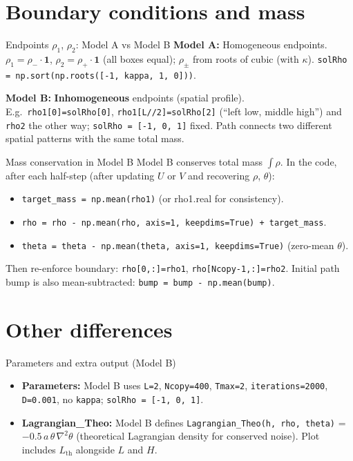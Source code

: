 \documentclass{beamer}
\begin{document}
\section{Boundary conditions and mass}
\begin{frame}{Endpoints $\rho_1$, $\rho_2$: Model A vs Model B}
    \textbf{Model A:} Homogeneous endpoints. $\rho_1 = \rho_- \cdot \mathbf{1}$, $\rho_2 = \rho_+ \cdot \mathbf{1}$ (all boxes equal); $\rho_\pm$ from roots of cubic (with $\kappa$). \texttt{solRho = np.sort(np.roots([-1, kappa, 1, 0]))}.
    \vspace{0.5em}
    
    \textbf{Model B:} \textbf{Inhomogeneous} endpoints (spatial profile). E.g.\ \texttt{rho1[0]=solRho[0]}, \texttt{rho1[L//2]=solRho[2]} (``left low, middle high'') and \texttt{rho2} the other way; \texttt{solRho = [-1, 0, 1]} fixed. Path connects two different spatial patterns with the same total mass.
\end{frame}

\begin{frame}{Mass conservation in Model B}
    Model B conserves total mass $\int \rho$. In the code, after each half-step (after updating $U$ or $V$ and recovering $\rho$, $\theta$):
    \begin{itemize}
        \item \texttt{target\_mass = np.mean(rho1)} (or rho1.real for consistency).
        \item \texttt{rho = rho - np.mean(rho, axis=1, keepdims=True) + target\_mass}.
        \item \texttt{theta = theta - np.mean(theta, axis=1, keepdims=True)} (zero-mean $\theta$).
    \end{itemize}
    Then re-enforce boundary: \texttt{rho[0,:]=rho1}, \texttt{rho[Ncopy-1,:]=rho2}. Initial path bump is also mean-subtracted: \texttt{bump = bump - np.mean(bump)}.
\end{frame}

\section{Other differences}
\begin{frame}{Parameters and extra output (Model B)}
    \begin{itemize}
        \item \textbf{Parameters:} Model B uses \texttt{L=2}, \texttt{Ncopy=400}, \texttt{Tmax=2}, \texttt{iterations=2000}, \texttt{D=0.001}, no \texttt{kappa}; \texttt{solRho = [-1, 0, 1]}.
        \item \textbf{Lagrangian\_Theo:} Model B defines \texttt{Lagrangian\_Theo(h, rho, theta)} = $-0.5\,a\,\theta\,\nabla^2\theta$ (theoretical Lagrangian density for conserved noise). Plot includes $L_{\mathrm{th}}$ alongside $L$ and $H$.
    \end{itemize}
\end{frame}
\end{document}
